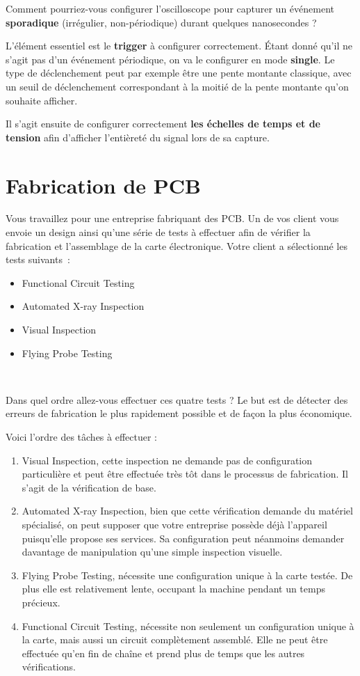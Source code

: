 \documentclass{exam}
\begin{document}
{
	Comment pourriez-vous configurer l'oscilloscope pour capturer un événement \textbf{sporadique} {\footnotesize (irrégulier, non-périodique)} durant quelques nanosecondes ?
}
{
	L'élément essentiel est le \textbf{trigger} à configurer correctement. Étant donné qu'il ne s'agit pas d'un événement périodique, on va le configurer en mode \textbf{single}. Le type de déclenchement peut par exemple être une pente montante classique, avec un seuil de déclenchement correspondant à la moitié de la pente montante qu'on souhaite afficher.

	Il s'agit ensuite de configurer correctement \textbf{les échelles de temps et de tension} afin d'afficher l'entièreté du signal lors de sa capture.
}

\clearpage






\section{Fabrication de PCB}
Vous travaillez pour une entreprise fabriquant des PCB.
Un de vos client vous envoie un design ainsi qu'une série de tests à effectuer afin de vérifier la fabrication et l'assemblage de la carte électronique.
Votre client a sélectionné les tests suivants~:
\begin{itemize}
	\item Functional Circuit Testing
	\item Automated X-ray Inspection
	\item Visual Inspection
	\item Flying Probe Testing
\end{itemize}
~\newline{}


{
	Dans quel ordre allez-vous effectuer ces quatre tests ? Le but est de détecter des erreurs de fabrication le plus rapidement possible et de façon la plus économique.
}
{
	Voici l'ordre des tâches à effectuer :
	\begin{enumerate}
		\item Visual Inspection, cette inspection ne demande pas de configuration particulière et peut être effectuée très tôt dans le processus de fabrication. Il s'agit de la vérification de base.
		\item Automated X-ray Inspection, bien que cette vérification demande du matériel spécialisé, on peut supposer que votre entreprise possède déjà l'appareil puisqu'elle propose ses services. Sa configuration peut néanmoins demander davantage de manipulation qu'une simple inspection visuelle.
		\item Flying Probe Testing, nécessite une configuration unique à la carte testée. De plus elle est relativement lente, occupant la machine pendant un temps précieux.
		\item Functional Circuit Testing, nécessite non seulement un configuration unique à la carte, mais aussi un circuit complètement assemblé. Elle ne peut être effectuée qu'en fin de chaîne et prend plus de temps que les autres vérifications.
	\end{enumerate}


}
\end{document}

